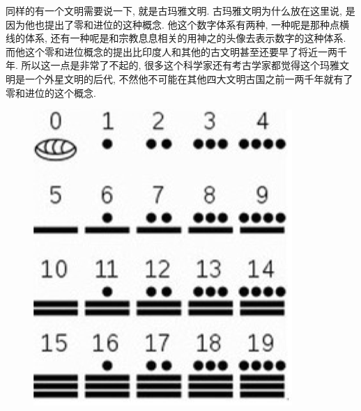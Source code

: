 同样的有一个文明需要说一下, 就是古玛雅文明. 古玛雅文明为什么放在这里说, 是因为他也提出了零和进位的这种概念. 他这个数字体系有两种, 一种呢是那种点横线的体系, 还有一种呢是和宗教息息相关的用神之的头像去表示数字的这种体系. 而他这个零和进位概念的提出比印度人和其他的古文明甚至还要早了将近一两千年. 所以这一点是非常了不起的, 很多这个科学家还有考古学家都觉得这个玛雅文明是一个外星文明的后代, 不然他不可能在其他四大文明古国之前一两千年就有了零和进位的这个概念. 

\begin{figure}[ht]
  \centering
  \begin{minipage}[t]{0.4\textwidth}
    \includegraphics[width=\textwidth]{asset/265551e1-4fa0-4611-b795-3835b8967cf0.png}
    \caption{}
    \label{fig:img2_9}
  \end{minipage}%
  \hspace{1em}
  \begin{minipage}[t]{0.4\textwidth}

\end{minipage}
\end{figure}
